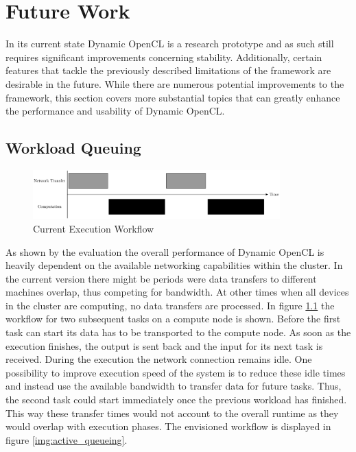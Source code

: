 \chapter{Future Work}

In its current state Dynamic OpenCL is a research prototype and as such still requires significant improvements concerning stability. Additionally, certain features that tackle the previously described limitations of the framework are desirable in the future. While there are numerous potential improvements to the framework, this section covers more substantial topics that can greatly enhance the performance and usability of Dynamic OpenCL.

\section*{Workload Queuing}

\begin{figure}[!htb]	
	\includegraphics[width=0.85\textwidth]{drawings/missing_queue.pdf}
	\centering
	\caption{Current Execution Workflow}
	\label{img:missing_queuing}
\end{figure}
As shown by the evaluation the overall performance of Dynamic OpenCL is heavily dependent on the available networking capabilities within the cluster. In the current version there might be periods were data transfers to different machines overlap, thus competing for bandwidth. At other times when all devices in the cluster are computing, no data transfers are processed. In figure \ref{img:missing_queuing} the workflow for two subsequent tasks on a compute node is shown. Before the first task can start its data has to be transported to the compute node. As soon as the execution finishes, the output is sent back and the input for its next task is received. During the execution the network connection remains idle. One possibility to improve execution speed of the system is to reduce these idle times and instead use the available bandwidth to transfer data for future tasks. Thus, the second task could start immediately once the previous workload has finished. This way these transfer times would not account to the overall runtime as they would overlap with execution phases. The envisioned workflow is displayed in figure \ref{img:active_queueing}.

